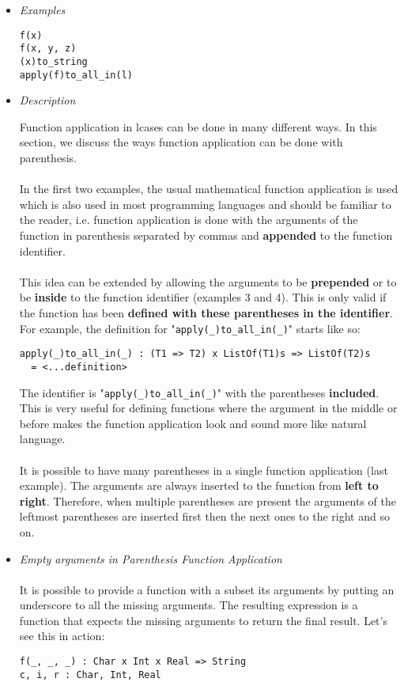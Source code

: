 \documentclass[diploma]{softlab-thesis}
\begin{document}
\begin{itemize}
\item \textit{Examples}

\begin{verbatim}
f(x)
f(x, y, z)
(x)to_string
apply(f)to_all_in(l)
\end{verbatim}

\item \textit{Description}

Function application in lcases can be done in many different ways. In this
section, we discuss the ways function application can be done with parenthesis.
\\\\
In the first two examples, the usual mathematical function application is used
which is also used in most programming languages and should be familiar to the
reader, i.e. function application is done with the arguments of the function in
parenthesis separated by commas and \textbf{appended} to the function
identifier.
\\\\
This idea can be extended by allowing the arguments to be \textbf{prepended} or
to be \textbf{inside} to the function identifier (examples 3 and 4). This is
only valid if the function has been \textbf{defined with these parentheses in
the identifier}. For example, the definition for
"\verb|apply(_)to_all_in(_)|"
starts like so:
\begin{verbatim}
apply(_)to_all_in(_) : (T1 => T2) x ListOf(T1)s => ListOf(T2)s
  = <...definition>
\end{verbatim}
The identifier is "\verb|apply(_)to_all_in(_)|" with the parentheses
\textbf{included}.  This is very useful for defining functions where the
argument in the middle or before makes the function application look and sound
more like natural language.
\\\\
It is possible to have many parentheses in a single function application (last
example). The arguments are always inserted to the function from \textbf{left
to right}.  Therefore, when multiple parentheses are present the arguments of
the leftmost parentheses are inserted first then the next ones to the right and
so on.

\newpage
\item \textit{Empty arguments in Parenthesis Function Application}
\\\\
It is possible to provide a function with a subset its arguments by putting an
underscore to all the missing arguments. The resulting expression is a function
that expects the missing arguments to return the final result. Let's see
this in action:
\begin{verbatim}
f(_, _, _) : Char x Int x Real => String
c, i, r : Char, Int, Real


\end{verbatim}
\end{itemize}
\end{document}
